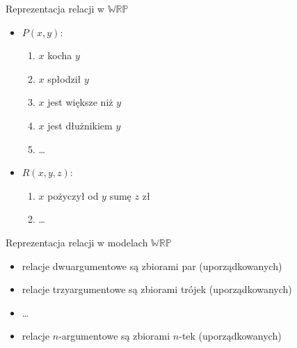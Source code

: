 \documentclass{beamer}
\newcommand {\WRP} {\ensuremath{\mathbb{WRP}}}
\begin{document}
\begin{frame}{Reprezentacja relacji w \WRP}
%
\begin{itemize}
\item $P(x, y)$:
\begin{enumerate}
\item $x$ kocha $y$
\item $x$ spłodził $y$
\item $x$ jest większe niż $y$
\item $x$ jest dłużnikiem $y$
\item \dots
\end{enumerate}
%
\item $R(x, y, z)$:
\begin{enumerate}
\item  $x$ pożyczył od $y$ sumę $z$ zł
\item \dots
\end{enumerate}
\end{itemize}
\end{frame}

\begin{frame}{Reprezentacja relacji w modelach \WRP}
%
\begin{itemize}
\item relacje dwuargumentowe są zbiorami par (uporządkowanych)
%
\item relacje trzyargumentowe są zbiorami trójek (uporządkowanych)
%
\item \dots
\item relacje $n$-argumentowe są zbiorami $n$-tek (uporządkowanych)
\end{itemize}
\end{frame}
\end{document}
